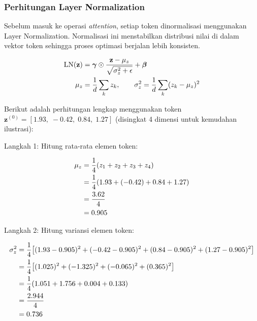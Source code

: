  
\subsubsection{Perhitungan Layer Normalization}
 
Sebelum masuk ke operasi \textit{attention}, setiap token dinormalisasi
menggunakan Layer Normalization. Normalisasi ini menstabilkan distribusi
nilai di dalam vektor token sehingga proses optimasi berjalan lebih
konsisten.
 
\vspace{0.5cm}
\begin{align}
  \mathrm{LN}(\mathbf{z})
  &= \boldsymbol{\gamma} \odot
    \frac{\mathbf{z}-\mu_z}{\sqrt{\sigma_z^2+\epsilon}}
    + \boldsymbol{\beta} \notag \\
  \mu_z &= \frac{1}{d}\sum_k z_k,\qquad
  \sigma_z^2 = \frac{1}{d}\sum_k(z_k-\mu_z)^2
\end{align}
\vspace{0.5cm}
 
\noindent
Berikut adalah perhitungan lengkap menggunakan token
$\mathbf{z}^{(0)} = [1.93,\;-0.42,\;0.84,\;1.27]$
(disingkat 4 dimensi untuk kemudahan ilustrasi):
 
\vspace{0.5cm}
\noindent Langkah 1: Hitung rata-rata elemen token:
 
\vspace{0.5cm}
\begin{align*}
  \mu_z
  &= \frac{1}{4}(z_1 + z_2 + z_3 + z_4) \notag \\
  &= \frac{1}{4}(1.93 + (-0.42) + 0.84 + 1.27) \notag \\
  &= \frac{3.62}{4} \notag \\
  &= 0.905
\end{align*}
\vspace{0.5cm}
 
\noindent Langkah 2: Hitung variansi elemen token:
 
\vspace{0.5cm}
\begin{align*}
  \sigma_z^2
  &= \frac{1}{4}\bigl[(1.93-0.905)^2 + (-0.42-0.905)^2
     + (0.84-0.905)^2 + (1.27-0.905)^2\bigr] \notag \\
  &= \frac{1}{4}\bigl[(1.025)^2 + (-1.325)^2 + (-0.065)^2 + (0.365)^2\bigr] \notag \\
  &= \frac{1}{4}(1.051 + 1.756 + 0.004 + 0.133) \notag \\
  &= \frac{2.944}{4} \notag \\
  &= 0.736
\end{align*}
\vspace{0.5cm}
 
